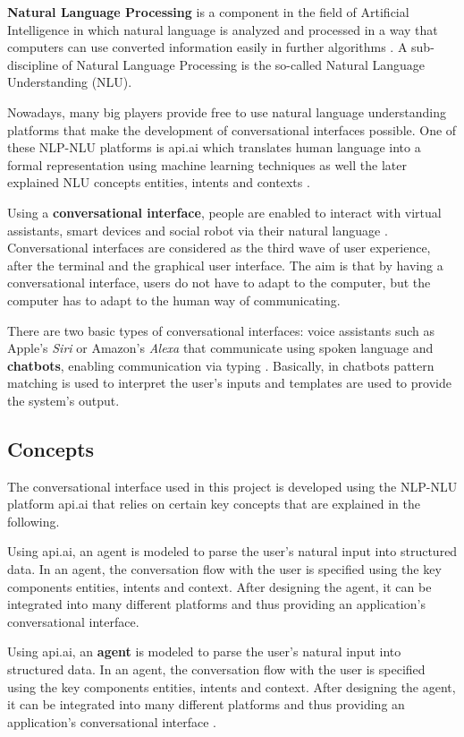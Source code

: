 \textbf{Natural Language Processing} is a component in the field of Artificial Intelligence in which natural language is analyzed and processed in a way that computers can use converted information easily in further algorithms \cite{collobert08}. A sub-discipline of Natural Language Processing is the so-called Natural Language Understanding (NLU).

Nowadays, many big players provide free to use natural language understanding platforms that make the development of conversational interfaces possible. One of these NLP-NLU platforms is api.ai which translates human language into a formal representation using machine learning techniques as well the later explained NLU concepts entities, intents and contexts \cite{apiai:concepts}.

Using a \textbf{conversational interface}, people are enabled to interact with virtual assistants, smart devices and social robot via their natural language \cite{mctear16}. Conversational interfaces are considered as the third wave of user experience, after the terminal and the graphical user interface. The aim is that by having a conversational interface, users do not have to adapt to the computer, but the computer has to adapt to the human way of communicating.

There are two basic types of conversational interfaces: voice assistants such as Apple's \textit{Siri} or Amazon's \textit{Alexa} that communicate using spoken language and \textbf{chatbots}, enabling communication via typing \cite{fastcodedesign:conversationalinterface}. Basically, in chatbots pattern matching is used to interpret the user's inputs and templates are used to provide the system's output.
 

\subsection{Concepts}

The conversational interface used in this project is developed using the NLP-NLU platform api.ai that relies on certain key concepts that are explained in the following.

Using api.ai, an agent is modeled to parse the user’s natural input into structured data. In an agent, the conversation flow with the user is specified using the key components entities, intents and context. After designing the agent, it can be integrated into many different platforms and thus providing an application’s conversational interface.

Using api.ai, an \textbf{agent} is modeled to parse the user’s natural input into structured data. In an agent, the conversation flow with the user is specified using the key components entities, intents and context. After designing the agent, it can be integrated into many different platforms and thus providing an application’s conversational interface \cite{apiai:agents}.


